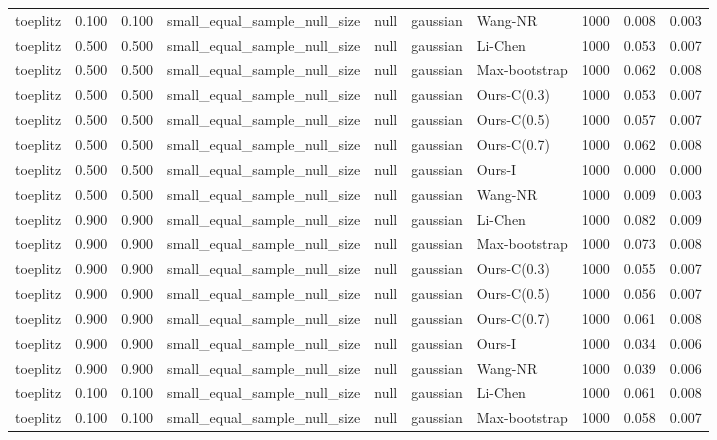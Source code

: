 \begin{tabular}{lrrllllrrr}
toeplitz & 0.100 & 0.100 & small\_equal\_sample\_null\_size & null & gaussian & Wang-NR & 1000 & 0.008 & 0.003 \\
toeplitz & 0.500 & 0.500 & small\_equal\_sample\_null\_size & null & gaussian & Li-Chen & 1000 & 0.053 & 0.007 \\
toeplitz & 0.500 & 0.500 & small\_equal\_sample\_null\_size & null & gaussian & Max-bootstrap & 1000 & 0.062 & 0.008 \\
toeplitz & 0.500 & 0.500 & small\_equal\_sample\_null\_size & null & gaussian & Ours-C(0.3) & 1000 & 0.053 & 0.007 \\
toeplitz & 0.500 & 0.500 & small\_equal\_sample\_null\_size & null & gaussian & Ours-C(0.5) & 1000 & 0.057 & 0.007 \\
toeplitz & 0.500 & 0.500 & small\_equal\_sample\_null\_size & null & gaussian & Ours-C(0.7) & 1000 & 0.062 & 0.008 \\
toeplitz & 0.500 & 0.500 & small\_equal\_sample\_null\_size & null & gaussian & Ours-I & 1000 & 0.000 & 0.000 \\
toeplitz & 0.500 & 0.500 & small\_equal\_sample\_null\_size & null & gaussian & Wang-NR & 1000 & 0.009 & 0.003 \\
toeplitz & 0.900 & 0.900 & small\_equal\_sample\_null\_size & null & gaussian & Li-Chen & 1000 & 0.082 & 0.009 \\
toeplitz & 0.900 & 0.900 & small\_equal\_sample\_null\_size & null & gaussian & Max-bootstrap & 1000 & 0.073 & 0.008 \\
toeplitz & 0.900 & 0.900 & small\_equal\_sample\_null\_size & null & gaussian & Ours-C(0.3) & 1000 & 0.055 & 0.007 \\
toeplitz & 0.900 & 0.900 & small\_equal\_sample\_null\_size & null & gaussian & Ours-C(0.5) & 1000 & 0.056 & 0.007 \\
toeplitz & 0.900 & 0.900 & small\_equal\_sample\_null\_size & null & gaussian & Ours-C(0.7) & 1000 & 0.061 & 0.008 \\
toeplitz & 0.900 & 0.900 & small\_equal\_sample\_null\_size & null & gaussian & Ours-I & 1000 & 0.034 & 0.006 \\
toeplitz & 0.900 & 0.900 & small\_equal\_sample\_null\_size & null & gaussian & Wang-NR & 1000 & 0.039 & 0.006 \\
toeplitz & 0.100 & 0.100 & small\_equal\_sample\_null\_size & null & gaussian & Li-Chen & 1000 & 0.061 & 0.008 \\
toeplitz & 0.100 & 0.100 & small\_equal\_sample\_null\_size & null & gaussian & Max-bootstrap & 1000 & 0.058 & 0.007 \\

\end{tabular}
